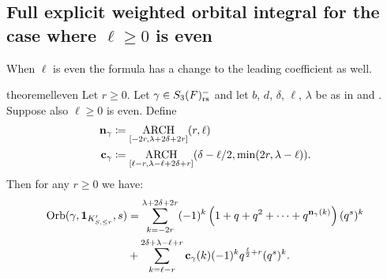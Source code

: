\subsection{Full explicit weighted orbital integral for the case where $\ell \ge 0$ is even}
When $\ell$ is even the formula has a change to the leading coefficient as well.
\begin{restatable}{theorem}{elleven}
  \label{thm:full_orbital_ell_even}
  Let $r \ge 0$.
  Let $\gamma \in S_3(F)_{\mathrm{rs}}^-$ and let $b$, $d$, $\delta$, $\ell$, $\lambda$ be as in
   and .
  Suppose also $\ell \ge 0$ is even.
  Define
  \begin{align*}
    \mathbf n_\gamma &\coloneqq \operatorname*{ARCH}_{[-2r, \lambda + 2\delta + 2r]}(r, \ell) \\
    \mathbf c_\gamma &\coloneqq \operatorname*{ARCH}_{[\ell-r, \lambda - \ell + 2\delta + r]}
    (\delta - \ell/2, \min(2r, \lambda-\ell)).
  \end{align*}
  Then for any $r \ge 0$ we have:
  \begin{align*}
    \operatorname{Orb}(\gamma, \mathbf{1}_{K'_{S, \le r}}, s)
    &= \sum_{k = -2r}^{\lambda + 2\delta +  2r}
    (-1)^k \left( 1 + q + q^2 + \dots + q^{\mathbf n_{\gamma}(k)}  \right) (q^s)^k \\
    &+ \sum_{k = \ell-r}^{2\delta + \lambda - \ell + r} \mathbf c_\gamma(k) (-1)^k q^{\frac{\ell}{2}+r} (q^s)^k.
  \end{align*}
\end{restatable}

